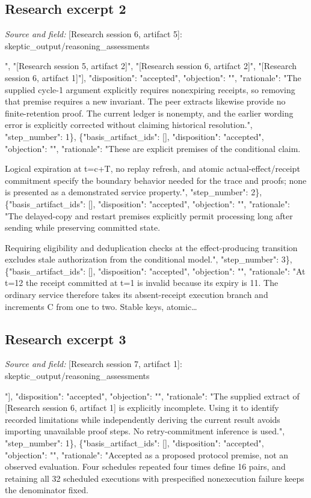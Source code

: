 \documentclass[11pt]{article}
\begin{document}
\subsection{Research excerpt 2}
\textit{Source and field: }[Research session 6, artifact 5]: skeptic\_output/reasoning\_assessments\par
[\{"basis\_artifact\_ids": ["[Research session 6, artifact 3]", "[Research session 5, artifact 2]", "[Research session 6, artifact 2]", "[Research session 6, artifact 1]"], "disposition": "accepted", "objection": "", "rationale": "The supplied cycle-1 argument explicitly requires nonexpiring receipts, so removing that premise requires a new invariant. The peer extracts likewise provide no finite-retention proof. The current ledger is nonempty, and the earlier wording error is explicitly corrected without claiming historical resolution.", "step\_number": 1\}, \{"basis\_artifact\_ids": [], "disposition": "accepted", "objection": "", "rationale": "These are explicit premises of the conditional claim.

Logical expiration at t=c+T, no replay refresh, and atomic actual-effect/receipt commitment specify the boundary behavior needed for the trace and proofs; none is presented as a demonstrated service property.", "step\_number": 2\}, \{"basis\_artifact\_ids": [], "disposition": "accepted", "objection": "", "rationale": "The delayed-copy and restart premises explicitly permit processing long after sending while preserving committed state.

Requiring eligibility and deduplication checks at the effect-producing transition excludes stale authorization from the conditional model.", "step\_number": 3\}, \{"basis\_artifact\_ids": [], "disposition": "accepted", "objection": "", "rationale": "At t=12 the receipt committed at t=1 is invalid because its expiry is 11. The ordinary service therefore takes its absent-receipt execution branch and increments C from one to two. Stable keys, atomic\ldots{}

\subsection{Research excerpt 3}
\textit{Source and field: }[Research session 7, artifact 1]: skeptic\_output/reasoning\_assessments\par
[\{"basis\_artifact\_ids": ["[Research session 6, artifact 1]"], "disposition": "accepted", "objection": "", "rationale": "The supplied extract of [Research session 6, artifact 1] is explicitly incomplete. Using it to identify recorded limitations while independently deriving the current result avoids importing unavailable proof steps. No retry-commitment inference is used.", "step\_number": 1\}, \{"basis\_artifact\_ids": [], "disposition": "accepted", "objection": "", "rationale": "Accepted as a proposed protocol premise, not an observed evaluation. Four schedules repeated four times define 16 pairs, and retaining all 32 scheduled executions with prespecified nonexecution failure keeps the denominator fixed.
\end{document}
